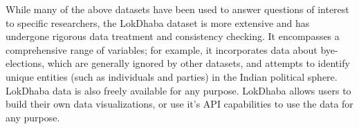 While many of the above datasets have been used to answer questions of interest to specific researchers, the LokDhaba dataset is more extensive and has undergone rigorous data treatment and consistency checking. It encompasses a comprehensive range of variables; for example, it incorporates data about bye-elections, which are generally ignored by other datasets, and attempts to identify unique entities (such as individuals and parties) in the Indian political sphere. LokDhaba data is also freely available for any purpose. LokDhaba allows users to build their own data visualizations, or use it's API capabilities to use the data for any purpose.






